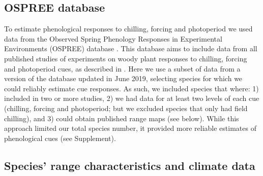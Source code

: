 \documentclass[12pt]{article}
\begin{document}
\subsection*{OSPREE database}
To estimate phenological responses to chilling, forcing and photoperiod we used data from the Observed Spring Phenology Responses in Experimental Environments (OSPREE) database  \citep{wolkovich2019}. This database aims to include data from all published studies of experiments on woody plant responses to chilling, forcing and photoperiod cues, as described in \citet{Ettinger:2020aa}. Here we use a subset of data from a version of the database updated in June 2019, selecting species for which we could reliably estimate cue responses. As such, we included species that where: 1) included in two or more studies, 2) we had data for at least two levels of each cue (chilling, forcing and photoperiod; but we excluded species that only had field chilling), and 3) could obtain published range maps (see below). While this approach limited our total species number, it provided more reliable estimates of phenological cues (see Supplement). 


\subsection*{Species' range characteristics and climate data}
\end{document}
